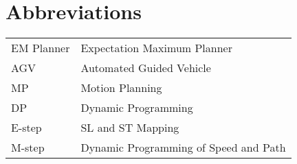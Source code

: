 \documentclass{report}
\begin{document}
  \section*{Abbreviations}
  \begin{tabular}{ll}
  EM Planner  & Expectation Maximum Planner\\
  AGV & Automated Guided Vehicle\\
  MP  & Motion Planning\\
  DP & Dynamic Programming\\
  E-step & SL and ST Mapping\\
  M-step & Dynamic Programming of Speed and Path
  
  \end{tabular}
  
 
 \newpage
 
 \listoffigures
 
 
 \tableofcontents
 
 
\end{document}
